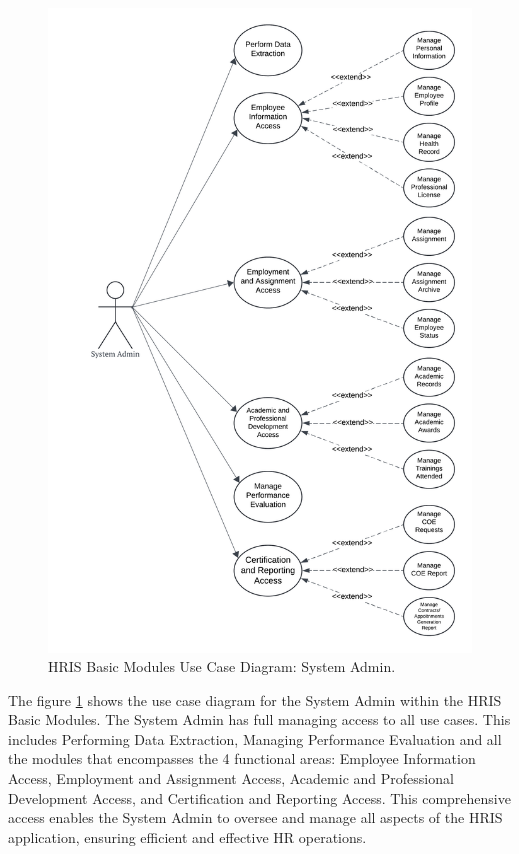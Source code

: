     \begin{figure}[H]
        \centering
        \includegraphics[width=0.9\linewidth]{figures/images/diagrams/usecase/use-case-basic-1.png}
        \caption{HRIS Basic Modules Use Case Diagram: System Admin.}
        \label{fig:use-case-basic-1}
    \end{figure}

    The figure \ref{fig:use-case-basic-1} shows the use case diagram for the System Admin within the HRIS Basic Modules. The System Admin has full managing access to all use cases. This includes Performing Data Extraction, Managing Performance Evaluation and all the modules that encompasses the 4 functional areas: Employee Information Access, Employment and Assignment Access, Academic and Professional Development Access, and Certification and Reporting Access. This comprehensive access enables the System Admin to oversee and manage all aspects of the HRIS application, ensuring efficient and effective HR operations.

